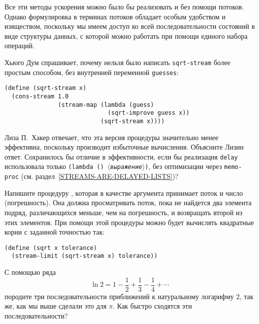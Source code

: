 Все эти методы ускорения можно было бы реализовать и без
помощи потоков.  Однако формулировка в терминах потоков обладает
особым удобством и изяществом, поскольку мы имеем доступ ко всей
последовательности состояний в виде структуры данных, с которой можно
работать при помощи единого набора операций.
\begin{exercise}{3.63}\label{EX3.63}%
Хьюго Дум спрашивает, почему нельзя было написать
{\tt sqrt-stream} более простым способом, без внутренней
переменной {\tt guesses}:

\begin{Verbatim}[fontsize=\small]
(define (sqrt-stream x)
  (cons-stream 1.0
               (stream-map (lambda (guess)
                             (sqrt-improve guess x))
                           (sqrt-stream x))))
\end{Verbatim}
Лиза П.~Хакер отвечает, что эта версия процедуры значительно менее
эффективна, поскольку производит избыточные вычисления.  Объясните
Лизин ответ.  Сохранилось бы отличие в эффективности, если бы
реализация {\tt delay} использовала только {\tt (lambda ()
\textit{$\langle$выражение$\rangle$})}, без оптимизации
через {\tt memo-proc} (см. раздел~\ref{STREAMS-ARE-DELAYED-LISTS})?
\end{exercise}
\begin{exercise}{3.64}\label{EX3.64}%
 Напишите процедуру , которая в
качестве аргумента принимает поток и число (погрешность).  Она должна
просматривать поток, пока не найдется два элемента подряд,
различающихся меньше, чем на погрешность, и возвращать второй из этих
элементов. При помощи этой процедуры можно будет вычислять квадратные
корни с заданной точностью так:

\begin{Verbatim}[fontsize=\small]
(define (sqrt x tolerance)
  (stream-limit (sqrt-stream x) tolerance))
\end{Verbatim}
\end{exercise}
\begin{exercise}{3.65}\label{EX3.65}%
%
%
С помощью ряда
$$
\ln 2 = 1 - \frac{1}{2} + \frac{1}{3} - \frac{1}{4} + \cdots
$$
породите три последовательности приближений к натуральному логарифму 2, так же, как
мы выше сделали это для $\pi$.  Как быстро сходятся эти
последовательности?
\end{exercise}

